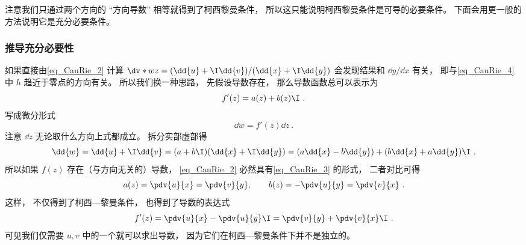 注意我们只通过两个方向的 “方向导数” 相等就得到了柯西黎曼条件， 所以这只能说明柯西黎曼条件是可导的必要条件。 下面会用更一般的方法说明它是充分必要条件。

\subsubsection{推导充分必要性}
如果直接由\autoref{eq_CauRie_2} 计算 $\dv*{w}{z} = (\dd{u} + \I \dd{v})/(\dd{x} + \I \dd{y})$ 会发现结果和 $\dd{y}/\dd{x}$ 有关， 即与\autoref{eq_CauRie_4} 中 $h$ 趋近于零点的方向有关。 所以我们换一种思路， 先假设导数存在， 那么导数函数总可以表示为
\begin{equation}
f'(z) = a(z) + b(z)\I~.
\end{equation}
写成微分形式
\begin{equation}
\dd{w} = f'(z)\dd{z}~.
\end{equation}
注意 $\dd z$ 无论取什么方向上式都成立。 拆分实部虚部得
\begin{equation}\label{eq_CauRie_3}
\dd{w} = \dd{u} + \I \dd{v} = (a + b\I)(\dd{x} + \I\dd{y}) = (a \dd{x} - b\dd{y}) + (b \dd{x} + a\dd{y})\I~.
\end{equation}
所以如果 $f(z)$ 存在（与方向无关的）导数， \autoref{eq_CauRie_2} 必然具有\autoref{eq_CauRie_3} 的形式， 二者对比可得
\begin{equation}
a(z) = \pdv{u}{x} = \pdv{v}{y}, \qquad
b(z) = -\pdv{u}{y} = \pdv{v}{x}~.
\end{equation}
这样， 不仅得到了柯西—黎曼条件， 也得到了导数的表达式
\begin{equation}
f'(z) = \pdv{u}{x} -\pdv{u}{y} \I = \pdv{v}{y} + \pdv{v}{x}\I~.
\end{equation}
可见我们仅需要 $u, v$ 中的一个就可以求出导数， 因为它们在柯西—黎曼条件下并不是独立的。


